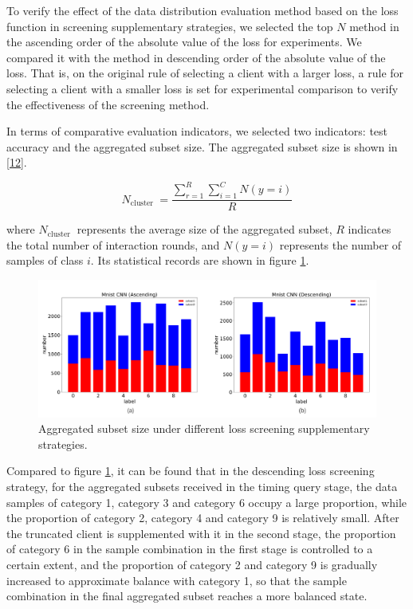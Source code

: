 \documentclass{article}
\begin{document}
To verify the effect of the data distribution evaluation method based on the loss function in screening supplementary strategies, we selected the top $N$ method in the ascending order of the absolute value of the loss for experiments. We compared it with the method in descending order of the absolute value of the loss. That is, on the original rule of selecting a client with a larger loss, a rule for selecting a client with a smaller loss is set for experimental comparison to verify the effectiveness of the screening method.

In terms of comparative evaluation indicators, we selected two indicators: test accuracy and the aggregated subset size. The aggregated subset size is shown in \ref{12}.

\begin{equation}
\label{12}
	N_{\text {cluster }}=\frac{\sum_{r=1}^{R} \sum_{i=1}^{C} N(y=i)}{R}
\end{equation}

\noindent
where $N_{\text {cluster }}$ represents the average size of the aggregated subset, $R$ indicates the total number of interaction rounds, and $N(y=i)$ represents the number of samples of class $i$. Its statistical records are shown in figure \ref{fig10}. 

\begin{figure}[!htbp]
\vspace{-0.4cm} 
	\centering
	\includegraphics[width=5.5in]{fig10.png}
	\caption{Aggregated subset size under different loss screening supplementary strategies.}
	\label{fig10}
\end{figure}

Compared to figure \ref{fig10}, it can be found that in the descending loss screening strategy, for the aggregated subsets received in the timing query stage, the data samples of category 1, category 3 and category 6 occupy a large proportion, while the proportion of category 2, category 4 and category 9 is relatively small. After the truncated client is supplemented with it in the second stage, the proportion of category 6 in the sample combination in the first stage is controlled to a certain extent, and the proportion of category 2 and category 9 is gradually increased to approximate balance with category 1, so that the sample combination in the final aggregated subset reaches a more balanced state. 
\end{document}
